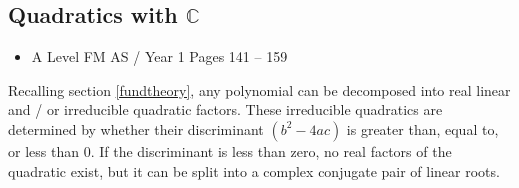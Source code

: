 \documentclass[11pt, a4paper]{article}
\begin{document}
\subsection{Quadratics with $\mathbb{C}$}
\begin{itemize}
\item A Level FM AS / Year 1 \hspace{1cm} Pages 141 -- 159
\end{itemize} \par
Recalling section \ref{fundtheory}, any polynomial can be decomposed into real linear and / or irreducible quadratic factors. These irreducible quadratics are determined by whether their discriminant $\left(b^{2}-4ac\right)$ is greater than, equal to, or less than $0$. If the discriminant is less than zero, no real factors of the quadratic exist, but it can be split into a complex conjugate pair of linear roots.
\vspace{0.5cm}
\end{document}
